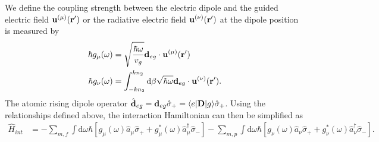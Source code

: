 \documentclass[preprint,aps,pra,onecolumn]{revtex4-1} %
\begin{document}
We define the coupling strength between the electric dipole and the guided electric field $\mathbf{u}^{(\mu)}(\mathbf{r}')$ or the radiative electric field $ \mathbf{u}^{(\nu)}(\mathbf{r}') $ at the dipole position is measured by
\begin{align}
\hbar g_\mu(\omega) &= \sqrt{\frac{\hbar \omega}{v_g}} \mathbf{d}_{eg}\cdot\mathbf{u}^{(\mu)}(\mathbf{r}') \\
\hbar g_\nu(\omega) &= \int_{-kn_2}^{kn_2}\mathrm{d}\beta \sqrt{\hbar \omega} \mathbf{d}_{eg}\cdot\mathbf{u}^{(\nu)}(\mathbf{r}').
\end{align}
The atomic rising dipole operator $\hat{\mathbf{d}}_{eg}=\mathbf{d}_{eg}\hat{\sigma}_+=\langle{e}\rvert\mathbf{D}\lvert{g}\rangle\hat{\sigma}_+$. Using the relationships defined above, the interaction Hamiltonian can then be simplified as
\begin{align}
\hat{H}_{int} &= -\sum_{m,f} \int\mathrm{d}\omega \hbar\left[g_\mu(\omega)\hat{a}_\mu\hat{\sigma}_+ +g_\mu^*(\omega)\hat{a}^\dagger_\mu\hat{\sigma}_- \right]
-\sum_{m,p} \int\mathrm{d}\omega \hbar\left[g_\nu(\omega)\hat{a}_\nu \hat{\sigma}_+ +g_\nu^*(\omega)\hat{a}^\dagger_\nu\hat{\sigma}_- \right]. 
\end{align}
\end{document}
